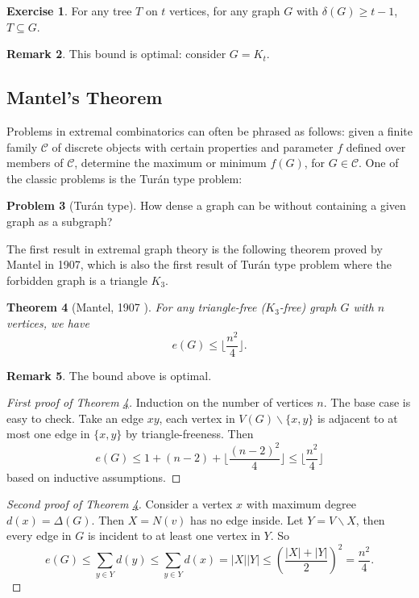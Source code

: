 \documentclass{article}
\newtheorem{theorem}{Theorem}[section]
\theoremstyle{definition}
\newtheorem{remark}[theorem]{Remark}
\newtheorem{exercise}[theorem]{Exercise}
\newtheorem{problem}[theorem]{Problem}
\def\Turan{Tur\'an}
\begin{document}
\begin{exercise}
    For any tree $T$ on $t$ vertices, for any graph $G$ with $\delta(G)\geq t-1$, $T\subseteq G$.  
\end{exercise}

\begin{remark}
    This bound is optimal: consider $G=K_t$.
\end{remark}

\subsection{Mantel's Theorem}

Problems in extremal combinatorics can often be phrased as follows: given a finite family $\mathcal{C}$ of discrete objects with certain properties and parameter $f$ defined over members of $\mathcal{C}$, determine the maximum or minimum $f(G)$, for $G\in\mathcal{C}$. One of the classic problems is the \Turan{} type problem:

\begin{problem}[\Turan{} type]
    How dense a graph can  be without containing a given graph as a subgraph?
\end{problem}

The first result in extremal graph theory is the following theorem proved by Mantel in 1907, which is also the first result of \Turan{} type problem where the forbidden graph is a triangle $K_3$.

\begin{theorem}[Mantel, 1907 \cite{mantel1906problem}]\label{Mantel thm}
    For any triangle-free ($K_{3}$-free) graph $G$ with $n$ vertices, we have 
 $$e(G)\le \lfloor\frac{n^2}{4}\rfloor.$$
\end{theorem}

\begin{remark}
    The bound above is optimal.
\end{remark}

\begin{proof}[First proof of Theorem \ref{Mantel thm}]
    Induction on the number of vertices $n$. The base case is easy to check. Take an edge $xy$, each vertex in $V(G)\backslash\{ x,y\}$ is adjacent to at most one edge in $\{ x,y\}$ by triangle-freeness. Then $$e(G)\leq 1+(n-2)+\lfloor\frac{(n-2)^2}{4}\rfloor\leq\lfloor\frac{n^2}{4}\rfloor$$ based on inductive assumptions.
\end{proof}

\begin{proof}[Second proof of Theorem \ref{Mantel thm}]
    Consider a vertex $x$ with maximum degree $d(x)=\Delta(G)$. Then $X=N(v)$ has no edge inside. Let $Y=V\backslash X$, then every edge in $G$ is incident to at least one vertex in $Y$. So $$e(G)\leq\sum_{y\in Y}d(y)\leq\sum_{y\in Y}d(x)=|X||Y|\leq\left(\frac{|X|+|Y|}{2}\right)^{2}=\frac{n^2}{4}.$$
\end{proof}
\end{document}
